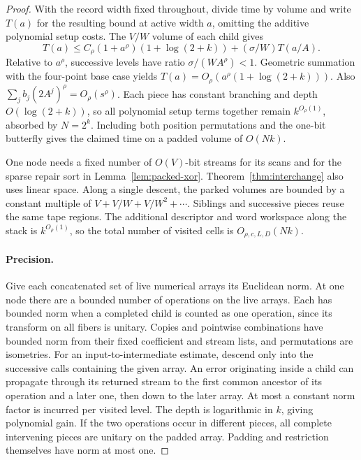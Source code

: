 \begin{proof}
With the record width fixed throughout, divide time by volume and
write \(T(a)\) for the resulting bound at active width \(a\), omitting
the additive polynomial setup costs. The \(V/W\) volume of each child
gives
\[
 T(a)\le C_\rho(1+a^\rho)(1+\log(2+k))
                 +(\sigma/W)T(a/A).
\]
Relative to \(a^\rho\), successive levels have ratio
\(\sigma/(WA^\rho)<1\). Geometric summation with the four-point base
case yields \(T(a)=O_\rho(a^\rho(1+\log(2+k)))\). Also
\(\sum_j b_j(2A^j)^\rho=O_\rho(s^\rho)\). Each piece has constant
branching and depth \(O(\log(2+k))\), so all polynomial setup terms
together remain \(k^{O_\rho(1)}\), absorbed by \(N=2^k\). Including
both position permutations and the one-bit butterfly gives the
claimed time on a padded volume of \(O(Nk)\).

One node needs a fixed number of \(O(V)\)-bit streams for its scans
and for the sparse repair sort in Lemma~\ref{lem:packed-xor}.
Theorem~\ref{thm:interchange} also uses linear space. Along a single
descent, the parked volumes are bounded by a constant multiple of
\(V+V/W+V/W^2+\cdots\). Siblings and successive pieces reuse the
same tape regions. The additional descriptor and word workspace
along the stack is \(k^{O_\rho(1)}\), so the total number of visited
cells is \(O_{\rho,c,L,D}(Nk)\).

\paragraph{Precision.}
Give each concatenated set of live numerical arrays its Euclidean
norm. At one node there are a bounded number of operations on the
live arrays. Each has bounded norm when a completed child is counted
as one operation, since its transform on all fibers is unitary.
Copies and pointwise combinations have bounded norm from their
fixed coefficient and stream lists, and permutations are isometries.
For an input-to-intermediate estimate, descend only into the successive
calls containing the given array. An error originating inside a child
can propagate through its returned stream to the first common ancestor
of its operation and a later one, then down to the later array. At
most a constant norm factor is incurred per visited level. The depth
is logarithmic in \(k\), giving polynomial gain. If the two operations
occur in different pieces, all complete intervening pieces are
unitary on the padded array. Padding and restriction themselves have
norm at most one.


\end{proof}
